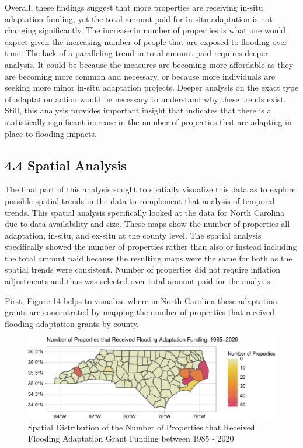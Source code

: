 \documentclass[
  12pt,
]{article}
\begin{document}
Overall, these findings suggest that more properties are receiving
in-situ adaptation funding, yet the total amount paid for in-situ
adaptation is not changing significantly. The increase in number of
properties is what one would expect given the increasing number of
people that are exposed to flooding over time. The lack of a paralleling
trend in total amount paid requires deeper analysis. It could be because
the measures are becoming more affordable as they are becoming more
common and necessary, or because more individuals are seeking more minor
in-situ adaptation projects. Deeper analysis on the exact type of
adaptation action would be necessary to understand why these trends
exist. Still, this analysis provides important insight that indicates
that there is a statistically significant increase in the number of
properties that are adapting in place to flooding impacts.

\hypertarget{spatial-analysis}{%
\subsection{4.4 Spatial Analysis}\label{spatial-analysis}}

The final part of this analysis sought to spatially visualize this data
as to explore possible spatial trends in the data to complement that
analysis of temporal trends. This spatial analysis specifically looked
at the data for North Carolina due to data availability and size. These
maps show the number of properties all adaptation, in-situ, and ex-situ
at the county level. The spatial analysis specifically showed the number
of properties rather than also or instead including the total amount
paid because the resulting maps were the same for both as the spatial
trends were consistent. Number of properties did not require inflation
adjustments and thus was selected over total amount paid for the
analysis.

First, Figure 14 helps to visualize where in North Carolina these
adaptation grants are concentrated by mapping the number of properties
that received flooding adaptation grants by county.

\begin{figure}
\centering
\includegraphics{finalreport_files/figure-latex/unnamed-chunk-26-1.pdf}
\caption{Spatial Distribution of the Number of Properties that Received
Flooding Adaptation Grant Funding between 1985 - 2020}
\end{figure}
\end{document}

